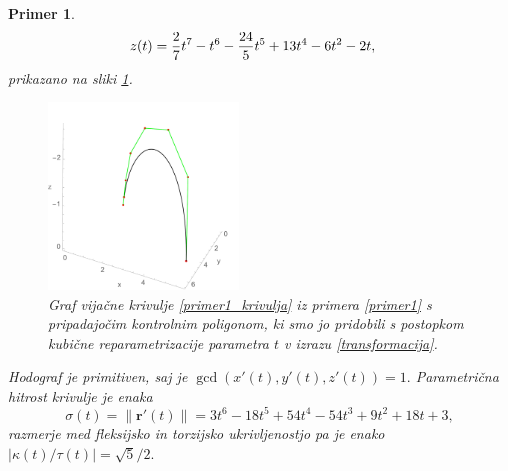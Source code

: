 \documentclass[12pt,a4paper,twoside]{article}
\theoremstyle{definition} %
\theoremstyle{plain} %
\theoremstyle{primerstyle}
\newtheorem{primer}[definicija]{Primer}
\numberwithin{equation}{section}  %
\newcommand{\rV}{\mathbf{r}}
\begin{document}
\begin{primer}
\begin{align}
		z(t)&=\frac{2}{7}t^7-t^6-\frac{24}{5}t^5+13t^4-6t^2-2t,\notag
	\end{align}
	prikazano na sliki \ref{fig:cubic_reparametrization}.
	\begin{figure}[h!]
	  \centering
	  \includegraphics[width=0.45\textwidth]{images/cubic_reparametrization.pdf}
	  \caption[Primer vijačne krivulje, pridobljene s kubično reparametrizacijo]{Graf vijačne krivulje \eqref{primer1_krivulja} iz primera \ref{primer1} s pripadajočim kontrolnim poligonom, ki smo jo pridobili s postopkom kubične reparametrizacije parametra $t$ v izrazu \eqref{transformacija}.}
	  \label{fig:cubic_reparametrization}
	\end{figure}
	Hodograf je primitiven, saj je $\gcd(x'(t),y'(t),z'(t))=1.$ Parametrična hitrost krivulje je enaka $$\sigma(t)=\lVert\rV'(t)\rVert=3t^6-18t^5+54t^4-54t^3+9t^2+18t+3,$$ razmerje med fleksijsko in torzijsko ukrivljenostjo pa je enako $|\kappa(t)/\tau(t)|=\sqrt{5}/2.$
\end{primer}
\end{document}
